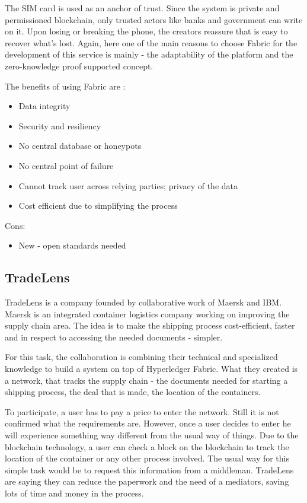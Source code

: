 \documentclass[a4paper,11pt]{report}
\begin{document}
	The SIM card is used as an anchor of trust. Since the system is
private and permissioned blockchain, only trusted actors like banks and government can write on it. Upon losing or breaking the phone, the creators reassure that is easy to recover what’s lost. 
Again, here one of the main reasons to choose Fabric for the development of this service is mainly - the adaptability of the platform and the zero-knowledge proof supported concept. \cite{verifyMeDemo}

The benefits of using Fabric are : 
\begin{itemize}
\item Data integrity 
\item Security and resiliency
\item No central database or honeypots 
\item No central point of failure
\item Cannot track user across relying parties; privacy of the data
\item Cost efficient due to simplifying the process
\end{itemize}
Cons: 
\begin{itemize}
\item New - open standards needed 
\end{itemize}

\subsection{TradeLens}
\label{tradelens}

	TradeLens is a company founded by collaborative work of Maersk and IBM. Maersk is an integrated container logistics company working on improving the supply chain area. The idea is to make the shipping process cost-efficient, faster and in respect to accessing the needed documents - simpler.
	 
	For this task, the collaboration is combining their technical and specialized knowledge to build a system on top of Hyperledger Fabric. What they created is a network, that tracks the supply chain - the documents needed for starting a shipping process, the deal that is made, the location of the containers.
	 
	To participate, a user has to pay a price to enter the network. Still it is not confirmed what the requirements are. However, once a user decides to enter he will experience something way different from the usual way of things. Due to the blockchain technology, a user can check a block on the blockchain to track the location of the container or any other process involved. The usual way for this simple task would be to request this information from a middleman. TradeLens are saying they can reduce the paperwork and the need of a mediators, saving lots of time and money in the process. \cite{tradeLensFounders}
	
\end{document}
